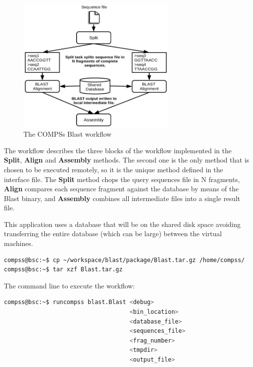 \begin{figure}[ht!]
  \centering
    \includegraphics[width=0.7\textwidth]{./Sections/2_Java/Figures/blast_workflow.jpeg}
    \caption{The COMPSs Blast workflow}
    \label{fig:BLAST_workflow}
\end{figure}

The workflow describes the three blocks of the workflow implemented in the {\bf Split}, {\bf Align} and 
{\bf Assembly} methods. The second one is the only method that is chosen to be executed remotely, so it 
is the unique method defined in the interface file. The {\bf Split} method chops the query sequences file 
in N fragments, {\bf Align} compares each sequence fragment against the database by means of the Blast 
binary, and {\bf Assembly} combines all intermediate files into a single result file.

This application uses a database that will be on the shared disk space avoiding transferring the entire 
database (which can be large) between the virtual machines.

\begin{lstlisting}[language=bash]
compss@bsc:~$ cp ~/workspace/blast/package/Blast.tar.gz /home/compss/
compss@bsc:~$ tar xzf Blast.tar.gz
\end{lstlisting}

The command line to execute the workflow:

\begin{lstlisting}[language=bash]
compss@bsc:~$ runcompss blast.Blast <debug> 
                                    <bin_location>
                                    <database_file> 
                                    <sequences_file>
                                    <frag_number> 
                                    <tmpdir>
                                    <output_file>
\end{lstlisting}

